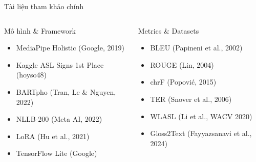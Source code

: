 ﻿\documentclass[aspectratio=169, 11pt]{beamer}
\begin{document}
\begin{frame}{Tài liệu tham khảo chính}
    \begin{columns}[T]
        \begin{block}{\small Mô hình \& Framework}
            \begin{itemize}\scriptsize
                \item MediaPipe Holistic (Google, 2019)
                \item Kaggle ASL Signs 1st Place (hoyso48)
                \item BARTpho (Tran, Le \& Nguyen, 2022)
                \item NLLB-200 (Meta AI, 2022)
                \item LoRA (Hu et al., 2021)
                \item TensorFlow Lite (Google)
            \end{itemize}
        \end{block}

        \begin{block}{\small Metrics \& Datasets}
            \begin{itemize}\scriptsize
                \item BLEU (Papineni et al., 2002)
                \item ROUGE (Lin, 2004)
                \item chrF (Popović, 2015)
                \item TER (Snover et al., 2006)
                \item WLASL (Li et al., WACV 2020)
                \item Gloss2Text (Fayyazsanavi et al., 2024)
            \end{itemize}
        \end{block}
    \end{columns}
\end{frame}
\end{document}
